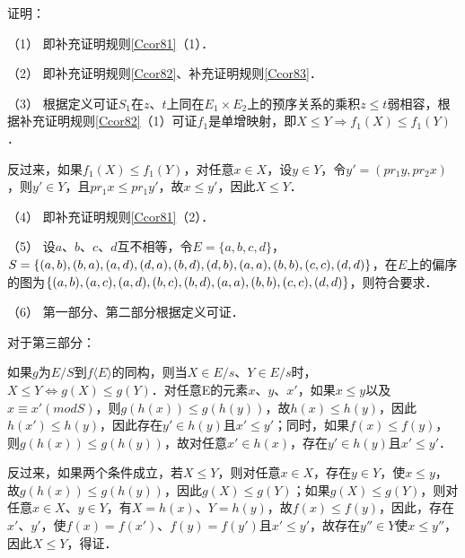 \documentclass[12pt, a4paper, oneside]{book}
\begin{document}
			证明：
			\par
			（1）	即补充证明规则\ref{Ccor81}（1）．
			\par
			（2）	即补充证明规则\ref{Ccor82}、补充证明规则\ref{Ccor83}．
			\par
			（3）	根据定义可证$S_1$在$z$、$t$上同在$E_1\times E_2$上的预序关系的乘积$z\leq t$弱相容，根据补充证明规则\ref{Ccor82}（1）可证$f_1$是单增映射，即$X\leq Y\Rightarrow f_1(X)\leq f_1(Y)$．
			\par
			反过来，如果$f_1(X)\leq f_1(Y)$，对任意$x\in X$，设$y\in Y$，令$y'=(pr_1y, pr_2x)$，则$y'\in Y$，且$pr_1x\leq pr_1y'$，故$x\leq y'$，因此$X\leq Y$．
			\par
			（4）	即补充证明规则\ref{Ccor81}（2）．
			\par
			（5）	设$a$、$b$、$c$、$d$互不相等，令$E=\{a, b, c, d\}$，$S=\{(a, b), (b, a), (a, d), (d, a), (b, d), \\(d, b), (a, a), (b, b), (c, c), (d, d)\}$，在$E$上的偏序的图为$\{(a, b), (a, c), (a, d), (b, c), (b, d), (a, a), \\(b, b), (c, c), (d, d)\}$，则符合要求．
			\par
			（6）	第一部分、第二部分根据定义可证．
			\par
			对于第三部分：
			\par
			如果$g$为$E/S$到$f\langle E\rangle$的同构，则当$X\in E/s$、$Y\in E/s$时，$X\leq Y\Leftrightarrow g(X)\leq g(Y)$．对任意E的元素$x$、$y$、$x'$，如果$x\leq y$以及$x\equiv x'(mod S)$，则$g(h(x))\leq g(h(y))$，故$h(x)\leq h(y)$，因此$h(x')\leq h(y)$，因此存在$y'\in h(y)$且$x'\leq y'$；同时，如果$f(x)\leq f(y)$，则$g(h(x))\leq g(h(y))$，故对任意$x'\in h(x)$，存在$y'\in h(y)$且$x'\leq y'$．
			\par
			反过来，如果两个条件成立，若$X\leq Y$，则对任意$x\in X$，存在$y\in Y$，使$x\leq y$，故$g(h(x))\leq g(h(y))$，因此$g(X)\leq g(Y)$；如果$g(X)\leq g(Y)$，则对任意$x\in X$、$y\in Y$，有$X=h(x)$、$Y=h(y)$，故$f(x)\leq f(y)$，因此，存在$x'$、$y'$，使$f(x)=f(x')$、$f(y)=f(y')$且$x'\leq y'$，故存在$y''\in Y$使$x\leq y''$，因此$X\leq Y$，得证．
			
\end{document}
